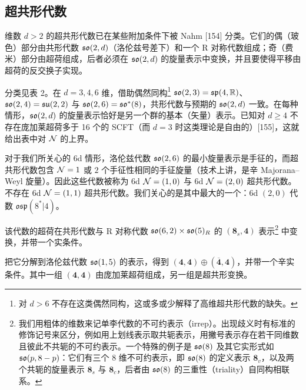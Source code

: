 \subsection{超共形代数}

维数 $d>2$ 的超共形代数已在某些附加条件下被 Nahm [154] 分类。它们的偶（玻色）部分由共形代数 $\mathfrak{so}(2,d)$（洛伦兹号差下）和一个 R 对称代数组成；奇（费米）部分由超荷组成，后者必须在 $\mathfrak{so}(2,d)$ 的旋量表示中变换，并且要使得平移由超荷的反交换子实现。

分类见表 2。在 $d=3,4,6$ 维，借助偶然同构\footnote{对 $d>6$ 不存在这类偶然同构，这或多或少解释了高维超共形代数的缺失。} $\mathfrak{so}(2,3)=\mathfrak{sp}(4,\mathbb{R})$、$\mathfrak{so}(2,4)=\mathfrak{su}(2,2)$ 与 $\mathfrak{so}(2,6)=\mathfrak{so}^*(8)$，共形代数与预期的 $\mathfrak{so}(2,d)$ 一致。在每种情形，$\mathfrak{so}(2,d)$ 的旋量表示恰好是另一个群的基本（矢量）表示。已知对 $d\ge 4$ 不存在庞加莱超荷多于 16 个的 SCFT（而 $d=3$ 时这类理论是自由的）[155]，这就给出表中对 $\mathcal{N}$ 的上界。


对于我们所关心的 6d 情形，洛伦兹代数 $\mathfrak{so}(2,6)$ 的最小旋量表示是手征的，而超共形代数包含 $\mathcal{N}=1$ 或 $2$ 个手征性相同的手征旋量（技术上讲，是辛 Majorana--Weyl 旋量）。因此这些代数被称为 6d $\mathcal{N}=(1,0)$ 与 6d $\mathcal{N}=(2,0)$ 超共形代数。不存在 6d $\mathcal{N}=(1,1)$ 超共形代数。我们关心的是其中最大的一个：6d $(2,0)$ 代数 $\mathfrak{osp}(8^*|4)$。

该代数的超荷在共形代数与 R 对称代数 $\mathfrak{so}(6,2)\times\mathfrak{so}(5)_R$ 的 $(\mathbf{8}_s,\mathbf{4})$ 表示\footnote{我们用粗体的维数来记单李代数的不可约表示（irrep）。出现歧义时有标准的修饰记号来区分，例如用上划线表示取共轭表示，用撇号表示存在若干同维数且彼此不共轭的不可约表示。一个特殊的例子是 $\mathfrak{so}(8)$ 及其它实形式如 $\mathfrak{so}(p,8-p)$：它们有三个 8 维不可约表示，即 $\mathfrak{so}(8)$ 的定义表示 $\mathbf{8}_v$，以及两个共轭的旋量表示 $\mathbf{8}_s$ 与 $\mathbf{8}_c$，后者由 $\mathfrak{so}(8)$ 的三重性（triality）自同构相联系。} 中变换，并带一个实条件。

把它分解到洛伦兹代数 $\mathfrak{so}(1,5)$ 的表示，得到 $(\mathbf{4},\mathbf{4})\oplus(\overline{\mathbf{4}},\mathbf{4})$，并带一个辛实条件。其中一组 $(\mathbf{4},\mathbf{4})$ 由庞加莱超荷组成，另一组是超共形变换。

